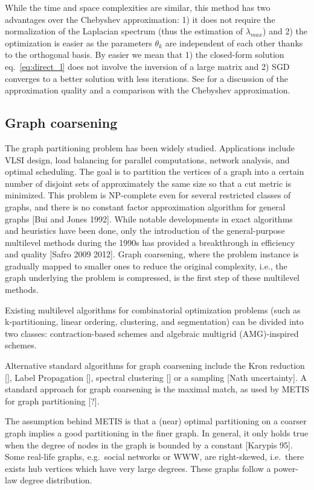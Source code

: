 \documentclass{article}
\begin{document}
While the time and space complexities are similar, this method has two
advantages over the Chebyshev approximation: 1) it does not require the
normalization of the Laplacian spectrum (thus the estimation of
\(\lambda_{max}\)) and 2) the optimization is easier as the parameters
\(\theta_k\) are independent of each other thanks to the orthogonal
basis. By easier we mean that 1) the closed-form solution
eq.~\ref{eq:direct_l} does not involve the inversion of a large matrix
and 2) \gls{SGD} converges to a better solution with less iterations.
See \citep{susnjara_accelerated_2015} for a discussion of the
approximation quality and a comparison with the Chebyshev approximation.

\subsection{Graph coarsening}\label{graph-coarsening}

The graph partitioning problem has been widely studied. Applications
include VLSI design, load balancing for parallel computations, network
analysis, and optimal scheduling. The goal is to partition the vertices
of a graph into a certain number of disjoint sets of approximately the
same size so that a cut metric is minimized. This problem is NP-complete
even for several restricted classes of graphs, and there is no constant
factor approximation algorithm for general graphs {[}Bui and Jones
1992{]}. While notable developments in exact algorithms and heuristics
have been done, only the introduction of the general-purpose multilevel
methods during the 1990s has provided a breakthrough in efficiency and
quality {[}Safro 2009 2012{]}. Graph coarsening, where the problem
instance is gradually mapped to smaller ones to reduce the original
complexity, i.e., the graph underlying the problem is compressed, is the
first step of these multilevel methods.

Existing multilevel algorithms for combinatorial optimization problems
(such as k-partitioning, linear ordering, clustering, and segmentation)
can be divided into two classes: contraction-based schemes and algebraic
multigrid (AMG)-inspired schemes.

Alternative standard algorithms for graph coarsening include the Kron
reduction {[}{]}, Label Propagation {[}{]}, spectral clustering {[}{]}
or a sampling {[}Nath uncertainty{]}. A standard approach for graph
coarsening is the maximal match, as used by METIS for graph partitioning
{[}?{]}.

The assumption behind METIS is that a (near) optimal partitioning on a
coarser graph implies a good partitioning in the finer graph. In
general, it only holds true when the degree of nodes in the graph is
bounded by a constant {[}Karypis 95{]}. Some real-life graphs,
e.g.~social networks or WWW, are right-skewed, i.e.~there exists hub
vertices which have very large degrees. These graphs follow a power-law
degree distribution.
\end{document}
